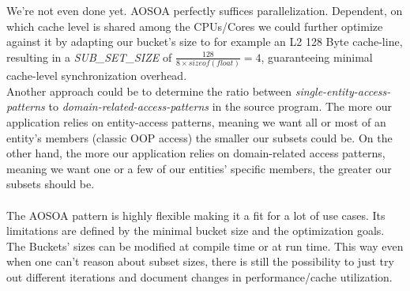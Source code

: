 We're not even done yet. AOSOA  perfectly suffices parallelization. Dependent, on which cache level is shared among the CPUs/Cores we could further optimize against it by adapting our bucket's size to for example an L2 128 Byte cache-line, resulting in a \textit{SUB\_SET\_SIZE} of $\frac{128}{8\times sizeof(float)} = 4$, guaranteeing minimal cache-level synchronization overhead.\\
Another approach could be to determine the ratio between \textit{single-entity-access-patterns} to \textit{domain-related-access-patterns} in the source program. The more our application relies on entity-access patterns, meaning we want all or most of an entity's members (classic OOP access) the smaller our subsets could be. On the other hand, the more our application relies on domain-related access patterns, meaning we want one or a few of our entities' specific members, the greater our subsets should be.\\\\
The AOSOA pattern is highly flexible making it a fit for a lot of use cases. Its limitations are defined by the minimal bucket size and the optimization goals. The Buckets' sizes can be modified at compile time or at run time. This way even when one can't reason about subset sizes, there is still the possibility to just try out different iterations and document changes in performance/cache utilization.

